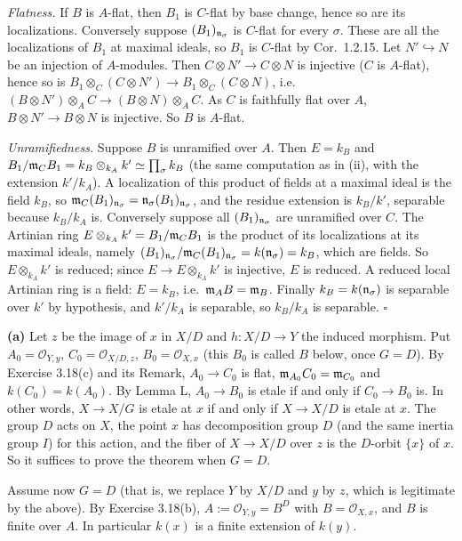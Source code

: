 \documentclass[11pt]{article}
\begin{document}
\emph{Flatness.} If $B$ is $A$-flat, then $B_1$ is $C$-flat by base change, hence so are its localizations. Conversely suppose $(B_1)_{\mathfrak n_\sigma}$ is $C$-flat for every $\sigma$. These are all the localizations of $B_1$ at maximal ideals, so $B_1$ is $C$-flat by Cor.~1.2.15. Let $N'\hookrightarrow N$ be an injection of $A$-modules. Then $C\otimes N'\to C\otimes N$ is injective ($C$ is $A$-flat), hence so is $B_1\otimes_C(C\otimes N')\to B_1\otimes_C(C\otimes N)$, i.e.\ $(B\otimes N')\otimes_AC\to(B\otimes N)\otimes_AC$. As $C$ is faithfully flat over $A$, $B\otimes N'\to B\otimes N$ is injective. So $B$ is $A$-flat.

\emph{Unramifiedness.} Suppose $B$ is unramified over $A$. Then $E=k_B$ and $B_1/\mathfrak m_CB_1=k_B\otimes_{k_A}k'\simeq\prod_\sigma k_B$ (the same computation as in (ii), with the extension $k'/k_A$). A localization of this product of fields at a maximal ideal is the field $k_B$, so $\mathfrak m_C(B_1)_{\mathfrak n_\sigma}=\mathfrak n_\sigma(B_1)_{\mathfrak n_\sigma}$, and the residue extension is $k_B/k'$, separable because $k_B/k_A$ is. Conversely suppose all $(B_1)_{\mathfrak n_\sigma}$ are unramified over $C$. The Artinian ring $E\otimes_{k_A}k'=B_1/\mathfrak m_CB_1$ is the product of its localizations at its maximal ideals, namely $(B_1)_{\mathfrak n_\sigma}/\mathfrak m_C(B_1)_{\mathfrak n_\sigma}=k(\mathfrak n_\sigma)=k_B$, which are fields. So $E\otimes_{k_A}k'$ is reduced; since $E\to E\otimes_{k_A}k'$ is injective, $E$ is reduced. A reduced local Artinian ring is a field: $E=k_B$, i.e.\ $\mathfrak m_AB=\mathfrak m_B$. Finally $k_B=k(\mathfrak n_\sigma)$ is separable over $k'$ by hypothesis, and $k'/k_A$ is separable, so $k_B/k_A$ is separable. $\square$

\textbf{(a)} Let $z$ be the image of $x$ in $X/D$ and $h:X/D\to Y$ the induced morphism. Put $A_0=\mathcal O_{Y,y}$, $C_0=\mathcal O_{X/D,z}$, $B_0=\mathcal O_{X,x}$ (this $B_0$ is called $B$ below, once $G=D$). By Exercise 3.18(c) and its Remark, $A_0\to C_0$ is flat, $\mathfrak m_{A_0}C_0=\mathfrak m_{C_0}$ and $k(C_0)=k(A_0)$. By Lemma L, $A_0\to B_0$ is etale if and only if $C_0\to B_0$ is. In other words, $X\to X/G$ is etale at $x$ if and only if $X\to X/D$ is etale at $x$. The group $D$ acts on $X$, the point $x$ has decomposition group $D$ (and the same inertia group $I$) for this action, and the fiber of $X\to X/D$ over $z$ is the $D$-orbit $\{x\}$ of $x$. So it suffices to prove the theorem when $G=D$.

Assume now $G=D$ (that is, we replace $Y$ by $X/D$ and $y$ by $z$, which is legitimate by the above). By Exercise 3.18(b), $A:=\mathcal O_{Y,y}=B^D$ with $B=\mathcal O_{X,x}$, and $B$ is finite over $A$. In particular $k(x)$ is a finite extension of $k(y)$.
\end{document}
